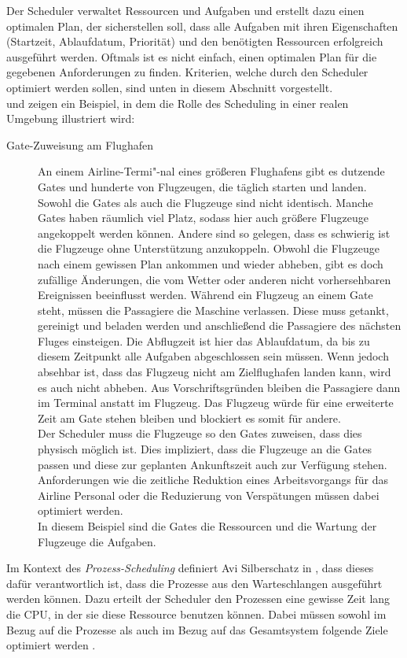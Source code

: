 Der Scheduler verwaltet Ressourcen und Aufgaben und erstellt dazu einen optimalen Plan, der sicherstellen soll, dass alle Aufgaben mit ihren Eigenschaften (Startzeit, Ablaufdatum, Priorität) und den benötigten Ressourcen erfolgreich ausgeführt werden. Oftmals ist es nicht einfach, einen optimalen Plan für die gegebenen Anforderungen zu finden. Kriterien, welche durch den Scheduler optimiert werden sollen, sind unten in diesem Abschnitt vorgestellt.\\
\cite{mpinedo} und \cite{aagnetis} zeigen ein Beispiel, in dem die Rolle des Scheduling in einer realen Umgebung illustriert wird:
\begin{description}
\item[Gate-Zuweisung am Flughafen]
An einem Airline-Termi"-nal eines größeren Flughafens gibt es dutzende Gates und hunderte von Flugzeugen, die täglich starten und landen. Sowohl die Gates als auch die Flugzeuge sind nicht identisch. Manche Gates haben räumlich viel Platz, sodass hier auch größere Flugzeuge angekoppelt werden können. Andere sind so gelegen, dass es schwierig ist die Flugzeuge ohne Unterstützung anzukoppeln. Obwohl die Flugzeuge nach einem gewissen Plan ankommen und wieder abheben, gibt es doch zufällige Änderungen, die vom Wetter oder anderen nicht vorhersehbaren Ereignissen beeinflusst werden. Während ein Flugzeug an einem Gate steht, müssen die Passagiere die Maschine verlassen. Diese muss getankt, gereinigt und beladen werden und anschließend die Passagiere des nächsten Fluges einsteigen. Die Abflugzeit ist hier das Ablaufdatum, da bis zu diesem Zeitpunkt alle Aufgaben abgeschlossen sein müssen. Wenn jedoch absehbar ist, dass das Flugzeug nicht am Zielflughafen landen kann, wird es auch nicht abheben. Aus Vorschriftsgründen bleiben die Passagiere dann im Terminal anstatt im Flugzeug. Das Flugzeug würde für eine erweiterte Zeit am Gate stehen bleiben und blockiert es somit für andere.\\
Der Scheduler muss die Flugzeuge so den Gates zuweisen, dass dies physisch möglich ist. Dies impliziert, dass die Flugzeuge an die Gates passen und diese zur geplanten Ankunftszeit auch zur Verfügung stehen. Anforderungen wie die zeitliche Reduktion eines Arbeitsvorgangs für das Airline Personal oder die Reduzierung von Verspätungen müssen dabei optimiert werden.\\
In diesem Beispiel sind die Gates die Ressourcen und die Wartung der Flugzeuge die Aufgaben. 
\end{description}
Im Kontext des \textit{Prozess-Scheduling} definiert Avi Silberschatz in \cite{asilberschatz}, dass dieses dafür verantwortlich ist, dass die Prozesse aus den Warteschlangen ausgeführt werden können. Dazu erteilt der Scheduler den Prozessen eine gewisse Zeit lang die CPU, in der sie diese Ressource benutzen können. Dabei müssen sowohl im Bezug auf die Prozesse als auch im Bezug auf das Gesamtsystem folgende Ziele optimiert werden \cite{asilberschatz} \cite{rlove}.\\
